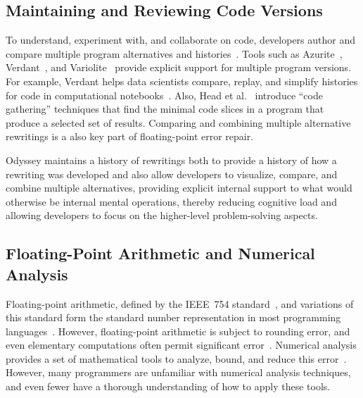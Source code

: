 \subsection{Maintaining and Reviewing Code Versions}

To understand, experiment with, and collaborate on code,
  developers author and compare
  multiple program alternatives and histories~\cite{codoban2015softwareHistory}.
Tools such as Azurite~\cite{yoon2015azurite}, Verdant~\cite{kery2018verdant}, and Variolite~\cite{kery2017variolite}
  provide explicit support for multiple program versions.
For example, Verdant helps data scientists
  compare, replay, and simplify histories
  for code in computational notebooks~\cite{kery2018verdant}. 
  Also, Head et al.~\cite{head2019managingMesses} introduce ``code gathering'' techniques
  that find the minimal code slices in a program
  that produce a selected set of results. 
Comparing and combining multiple alternative rewritings
  is a also key part of floating-point error repair.

Odyssey maintains a history of rewritings
  both to provide a history of how a rewriting was developed
  and also allow developers to visualize, compare, and combine
  multiple alternatives, providing explicit internal support
  to what would otherwise be internal mental operations,
  thereby reducing cognitive load and allowing developers
  to focus on the higher-level problem-solving aspects.

\subsection{Floating-Point Arithmetic and Numerical Analysis}

Floating-point arithmetic,
  defined by the IEEE~754 standard~\cite{ieee08-standard},
  and variations of this standard
  form the standard number representation
  in most programming languages~\cite{toplas08-pitfalls-verifying}.
However, floating-point arithmetic is subject to rounding error,
  and even elementary computations often permit significant
  error~\cite{acm91-every-scientist}.
Numerical analysis provides a set of mathematical tools
  to analyze, bound, and reduce this error~\cite{book87-nmse}.
However, many programmers are unfamiliar with
  numerical analysis techniques, and even fewer have
  a thorough understanding of how to apply these tools.

